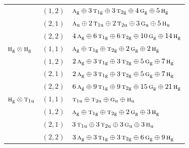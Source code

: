 \documentclass[11pt]{article}
\newcommand{\irr}[1]{\text{\normalfont\scshape #1}}
\newcommand{\ptag}[1]{\mathrm{#1}}
\begin{document}
\begin{longtable}{p{} c p{}}
 & $(1,2)$ & $\irr{a}_{\ptag{g}}\oplus 3\,\irr{t}_{1\ptag{g}}\oplus 3\,\irr{t}_{2\ptag{g}}\oplus 4\,\irr{g}_{\ptag{g}}\oplus 5\,\irr{h}_{\ptag{g}}$\\

 & $(2,1)$ & $\irr{a}_{\ptag{u}}\oplus 2\,\irr{t}_{1\ptag{u}}\oplus 2\,\irr{t}_{2\ptag{u}}\oplus 3\,\irr{g}_{\ptag{u}}\oplus 5\,\irr{h}_{\ptag{u}}$\\

 & $(2,2)$ & $4\,\irr{a}_{\ptag{g}}\oplus 6\,\irr{t}_{1\ptag{g}}\oplus 6\,\irr{t}_{2\ptag{g}}\oplus 10\,\irr{g}_{\ptag{g}}\oplus 14\,\irr{h}_{\ptag{g}}$\\

\hline

$\irr{h}_{\ptag{g}}\otimes \irr{h}_{\ptag{g}}$ & $(1,1)$ & $\irr{a}_{\ptag{g}}\oplus \irr{t}_{1\ptag{g}}\oplus \irr{t}_{2\ptag{g}}\oplus 2\,\irr{g}_{\ptag{g}}\oplus 2\,\irr{h}_{\ptag{g}}$\\

 & $(1,2)$ & $2\,\irr{a}_{\ptag{g}}\oplus 3\,\irr{t}_{1\ptag{g}}\oplus 3\,\irr{t}_{2\ptag{g}}\oplus 5\,\irr{g}_{\ptag{g}}\oplus 7\,\irr{h}_{\ptag{g}}$\\

 & $(2,1)$ & $2\,\irr{a}_{\ptag{g}}\oplus 3\,\irr{t}_{1\ptag{g}}\oplus 3\,\irr{t}_{2\ptag{g}}\oplus 5\,\irr{g}_{\ptag{g}}\oplus 7\,\irr{h}_{\ptag{g}}$\\

 & $(2,2)$ & $6\,\irr{a}_{\ptag{g}}\oplus 9\,\irr{t}_{1\ptag{g}}\oplus 9\,\irr{t}_{2\ptag{g}}\oplus 15\,\irr{g}_{\ptag{g}}\oplus 21\,\irr{h}_{\ptag{g}}$\\

\hline

$\irr{h}_{\ptag{g}}\otimes \irr{t}_{1\ptag{u}}$ & $(1,1)$ & $\irr{t}_{1\ptag{u}}\oplus \irr{t}_{2\ptag{u}}\oplus \irr{g}_{\ptag{u}}\oplus \irr{h}_{\ptag{u}}$\\

 & $(1,2)$ & $\irr{a}_{\ptag{g}}\oplus \irr{t}_{1\ptag{g}}\oplus \irr{t}_{2\ptag{g}}\oplus 2\,\irr{g}_{\ptag{g}}\oplus 3\,\irr{h}_{\ptag{g}}$\\

 & $(2,1)$ & $3\,\irr{t}_{1\ptag{u}}\oplus 3\,\irr{t}_{2\ptag{u}}\oplus 3\,\irr{g}_{\ptag{u}}\oplus 3\,\irr{h}_{\ptag{u}}$\\

 & $(2,2)$ & $3\,\irr{a}_{\ptag{g}}\oplus 3\,\irr{t}_{1\ptag{g}}\oplus 3\,\irr{t}_{2\ptag{g}}\oplus 6\,\irr{g}_{\ptag{g}}\oplus 9\,\irr{h}_{\ptag{g}}$\\


\end{longtable}
\end{document}
